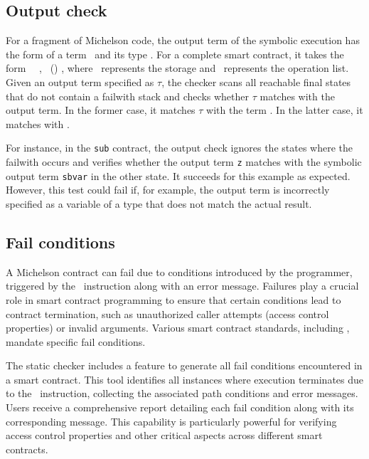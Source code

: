 \documentclass[runningheads]{llncs}
\begin{document}
\subsection{Output check}
\label{sec:output-check}
For a fragment of Michelson code, the output term of the symbolic execution has the form of a term \Term\ and its type \TY. For a complete smart contract, it takes the form \PAIR\ \VOPERATIONLIST\ \VSTORAGE, \TPAIR\ (\TOPERATIONLIST) \TYS, where \VSTORAGE\ represents the storage and \VOPERATIONLIST\ represents the operation list. Given an output term specified as $\tau$, the checker scans all reachable final states that do not contain a failwith stack and checks whether $\tau$ matches with the output term. In the former case, it matches $\tau$ with the term \Term. In the latter case, it matches with \VSTORAGE. 

For instance, in the \lstinline|sub| contract, the output check ignores the states where the failwith occurs and verifies whether the output term \lstinline|z| matches with the symbolic output term \lstinline/sbvar/ in the other state. It succeeds for this example as expected. However, this test could fail if, for example, the output term is incorrectly specified as a variable of a type that does not match the actual result.
\subsection{Fail conditions}
\label{sec:fail-conditions}
A Michelson contract can fail due to conditions introduced by the programmer, triggered by the \FAILWITH\ instruction along with an error message. Failures play a crucial role in smart contract programming to ensure that certain conditions lead to contract termination, such as unauthorized caller attempts (access control properties) or invalid arguments. Various smart contract standards, including \cite{erc,fa}, mandate specific fail conditions.

The static checker includes a feature to generate all fail conditions encountered in a smart contract. This tool identifies all instances where execution terminates due to the \FAILWITH\ instruction, collecting the associated path conditions and error messages. Users receive a comprehensive report detailing each fail condition along with its corresponding message. This capability is particularly powerful for verifying access control properties and other critical aspects across different smart contracts.
\end{document}
